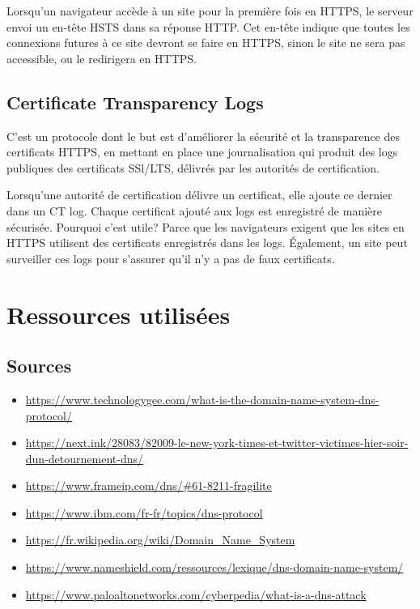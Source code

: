 \documentclass[12pt,a4paper]{article}
\begin{document}
	Lorsqu'un navigateur accède à un site pour la première fois en HTTPS, le serveur envoi un en-tête HSTS dans sa réponse HTTP. Cet en-tête indique que toutes les connexions futures à ce site devront se faire en HTTPS, sinon le site ne sera pas accessible, ou le redirigera en HTTPS.
	
	\subsection{Certificate Transparency Logs}
	
	C'est un protocole dont le but est d'améliorer la sécurité et la transparence des certificats HTTPS, en mettant en place une journalisation qui produit des logs publiques des certificats SSl/LTS, délivrés par les autorités de certification.
	
	Lorsqu'une autorité de certification délivre un certificat, elle ajoute ce dernier dans un CT log. Chaque certificat ajouté aux logs est enregistré de manière sécurisée. Pourquoi c'est utile? Parce que les navigateurs exigent que les sites en HTTPS utilisent des certificats enregistrés dans les logs. Également, un site peut surveiller ces logs pour s'assurer qu'il n'y a pas de faux certificats.

\newpage
	
	
\section{Ressources utilisées}

	\subsection*{Sources}

	\begin{itemize}
		\item \url{https://www.technologygee.com/what-is-the-domain-name-system-dns-protocol/}
		\item \url{https://next.ink/28083/82009-le-new-york-times-et-twitter-victimes-hier-soir-dun-detournement-dns/}
		\item \url{https://www.frameip.com/dns/#61-8211-fragilite}
		\item \url{https://www.ibm.com/fr-fr/topics/dns-protocol}
		\item \url{https://fr.wikipedia.org/wiki/Domain_Name_System}
		\item \url{https://www.nameshield.com/ressources/lexique/dns-domain-name-system/}
		\item \url{https://www.paloaltonetworks.com/cyberpedia/what-is-a-dns-attack}
	\end{itemize}
\end{document}
